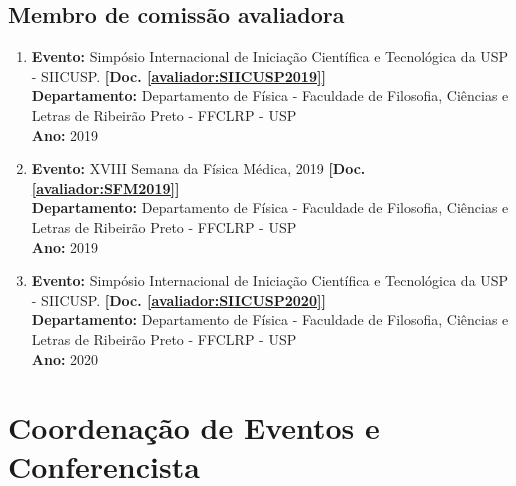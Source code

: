 \documentclass[a4paper,oneside,10pt]{article}
\begin{document}

\subsection{Membro de comissão avaliadora}
\vspace{0.3cm}

\begin{enumerate}
\renewcommand{\labelenumi}{{\large\bfseries\arabic{enumi}.}}

\item \textbf{Evento:} Simpósio Internacional de Iniciação Científica e Tecnológica da USP - SIICUSP. \textbf{[Doc. \ref{avaliador:SIICUSP2019}]}\\
      \textbf{Departamento:} Departamento de Física - Faculdade de Filosofia, Ciências e Letras de Ribeirão Preto - FFCLRP - USP\\
      \textbf{Ano:} 2019\\

\item \textbf{Evento:} XVIII Semana da Física Médica, 2019 \textbf{[Doc. \ref{avaliador:SFM2019}]}\\
      \textbf{Departamento:} Departamento de Física - Faculdade de Filosofia, Ciências e Letras de Ribeirão Preto - FFCLRP - USP\\
      \textbf{Ano:} 2019\\

      \item \textbf{Evento:} Simpósio Internacional de Iniciação Científica e Tecnológica da USP - SIICUSP. \textbf{[Doc. \ref{avaliador:SIICUSP2020}]}\\
      \textbf{Departamento:} Departamento de Física - Faculdade de Filosofia, Ciências e Letras de Ribeirão Preto - FFCLRP - USP\\
      \textbf{Ano:} 2020\\

\end{enumerate}

\section{Coordenação de Eventos e Conferencista}
\vspace{0.3cm}
\end{document}
